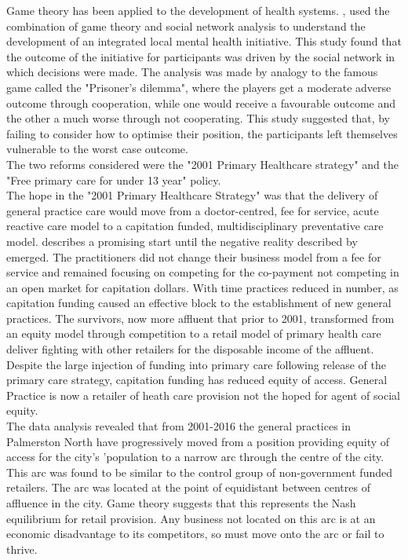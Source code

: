\documentclass[11pt,a4paper]{article}
\begin{document}
Game theory has been applied to the development of health systems. \citep{dobson2004sustainable}, used the combination of game theory and social network analysis to understand the development of an integrated local mental health initiative. This study found that the outcome of the initiative for participants was driven by the social network in which decisions were made. The analysis was made by analogy to the famous game called the "Prisoner's dilemma", where the players get a moderate adverse outcome through cooperation, while one would receive a favourable outcome and the other a much worse through not cooperating. This study suggested that, by failing to consider how to optimise their position, the participants left themselves vulnerable to the worst case outcome. \\

The two reforms considered were the "2001 Primary Healthcare strategy" \citep{king2001primary} and the "Free primary care for under 13 year" policy\citep{frizelle2014health}.\\

The hope in the "2001 Primary Healthcare Strategy" \citep{king2001primary} was that the delivery of general practice care would move from a doctor-centred, fee for service, acute reactive care model to a capitation funded, multidisciplinary preventative care model. \citet{hefford2005reducing} describes a promising start until the negative reality described by \citet{howell2005restructuring} emerged. The practitioners did not change their business model from a fee for service and remained focusing on competing for the co-payment not competing in an open market for capitation dollars. With time practices reduced in number, as capitation funding caused an effective block to the establishment of new general practices. The survivors, now more affluent that prior to 2001, transformed from an equity model through competition to a retail model of primary health care deliver fighting with other retailers for the disposable income of the affluent. Despite the large injection of funding into primary care following release of the primary care strategy, capitation funding has reduced equity of access. General Practice is now a retailer of heath care provision not the hoped for agent of social equity.\\

The data analysis revealed that from 2001-2016 the general practices in Palmerston North have progressively moved from a position providing equity of access for the city's 'population to a narrow arc through the centre of the city. This arc was found to be similar to the control group of non-government funded retailers. The arc was located at the point of equidistant between centres of affluence in the city. Game theory suggests that this represents the Nash equilibrium for retail provision. Any business not located on this arc is at an economic disadvantage to its competitors, so must move onto the arc or fail to thrive.\\
\end{document}

